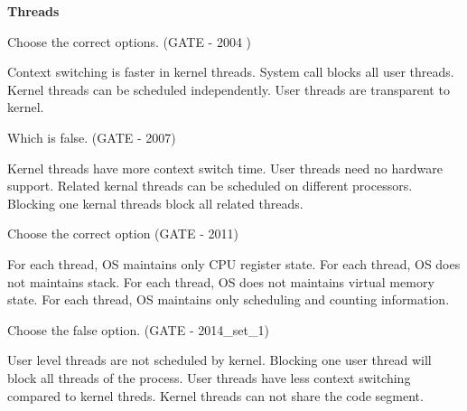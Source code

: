 \centerline{\textbf{ \LARGE Threads}}

\setcounter{question}{0}

  \question Choose the correct options. (GATE - 2004 )

  \begin{choices}
    \choice Context switching is faster in kernel threads.
    \choice System call blocks all user threads.
    \choice Kernel threads can be scheduled independently.
    \choice User threads are transparent to kernel.
  \end{choices}

  \question Which is false. (GATE -  2007)

  \begin{choices}
    \choice Kernel threads have more context switch time.
    \choice User threads need no hardware support.
    \choice Related kernal threads can be scheduled on different processors.
    \choice Blocking one kernal threads block all related threads.
  \end{choices}

  \question  Choose the correct option (GATE - 2011)

  \begin{choices}
    \choice For each thread, OS maintains only CPU register state.
    \choice For each thread, OS does not maintains  stack.
    \choice For each thread, OS does not maintains  virtual memory state.
    \choice For each thread, OS maintains only scheduling and counting information.
  \end{choices}

  \question  Choose the false option. (GATE - 2014\_set\_1)

  \begin{choices}
    \choice User level threads are not scheduled by kernel.
    \choice Blocking one user thread will block all threads of the process.
    \choice User threads have less context switching compared to kernel threds.
    \choice Kernel threads can not share the code segment.
  \end{choices}


\begin{comment}

  \question  (GATE - )

  \begin{choices}
    \choice
    \choice
    \choice
    \choice
  \end{choices}


\end{comment}
